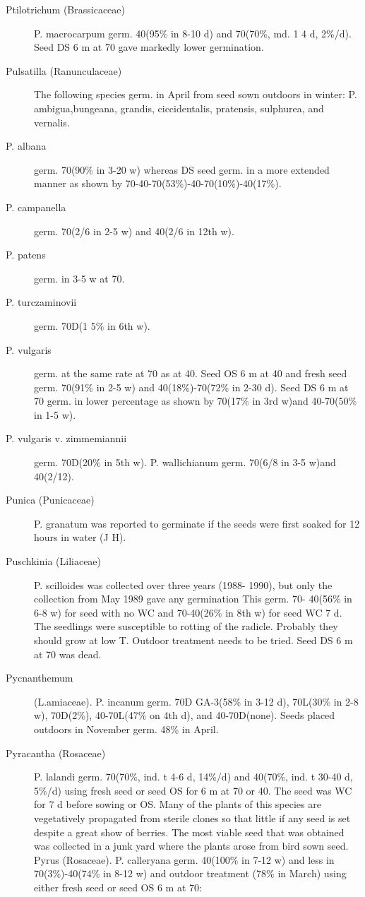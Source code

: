 \begin{description}
\item[Ptilotrichum (Brassicaceae)] P. macrocarpum germ. 40(95\% in 8-10 d) and
70(70\%, md. 1 4 d, 2\%/d). Seed DS 6 m at 70 gave markedly lower germination.

\item[Pulsatilla (Ranunculaceae)] The following species germ. in April from seed
sown outdoors in winter: P. ambigua,bungeana, grandis, ciccidentalis, pratensis,
sulphurea, and vernalis.
\item[P. albana] germ. 70(90\% in 3-20 w) whereas DS seed germ. in a more extended
manner as shown by 70-40-70(53\%)-40-70(10\%)-40(17\%).
\item[P. campanella] germ. 70(2/6 in 2-5 w) and 40(2/6 in 12th w).
\item[P. patens] germ. in 3-5 w at 70.
\item[P. turczaminovii] germ. 70D(1 5\% in 6th w).
\item[P. vulgaris] germ. at the same rate at 70 as at 40. Seed OS 6 m at 40 and fresh
seed germ. 70(91\% in 2-5 w) and 40(18\%)-70(72\% in 2-30 d). Seed DS 6 m at 70
germ. in lower percentage as shown by 70(17\% in 3rd w)and 40-70(50\% in 1-5 w).
\item[P. vulgaris v. zimmemiannii] germ. 70D(20\% in 5th w).
P. wallichianum germ. 70(6/8 in 3-5 w)and 40(2/12).

\item[Punica (Punicaceae)] P. granatum was reported to germinate if the seeds
were first soaked for 12 hours in water (J H).
\item[Puschkinia (Liliaceae)] P. scilloides was collected over three years (1988-
1990), but only the collection from May 1989 gave any germination This germ. 70-
40(56\% in 6-8 w) for seed with no WC and 70-40(26\% in 8th w) for seed WC 7 d. The
seedlings were susceptible to rotting of the radicle. Probably they should grow at low
T. Outdoor treatment needs to be tried. Seed DS 6 m at 70 was dead.

\item[Pycnanthemum] (L.amiaceae). P. incanum germ. 70D GA-3(58\% in 3-12 d),
70L(30\% in 2-8 w), 70D(2\%), 40-70L(47\% on 4th d), and 40-70D(none). Seeds
placed outdoors in November germ. 48\% in April.

\item[Pyracantha (Rosaceae)] P. lalandi germ. 70(70\%, ind. t 4-6 d, 14\%/d) and
40(70\%, ind. t 30-40 d, 5\%/d) using fresh seed or seed OS for 6 m at 70 or 40. The
seed was WC for 7 d before sowing or OS. Many of the plants of this species are
vegetatively propagated from sterile clones so that little if any seed is set despite a
great show of berries. The most viable seed that was obtained was collected in a junk
yard where the plants arose from bird sown seed.
Pyrus (Rosaceae). P. calleryana germ. 40(100\% in 7-12 w) and less in
70(3\%)-40(74\% in 8-12 w) and outdoor treatment (78\% in March) using either fresh
seed or seed OS 6 m at 70:


\end{description}
